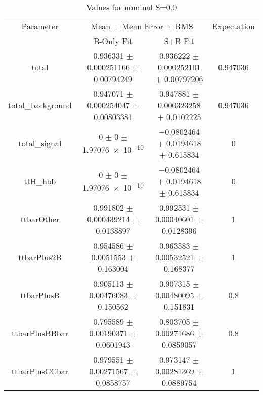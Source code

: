 \begin{table}
\centering
\caption{Values for nominal S=0.0}
\begin{tabular}{cccc}
\toprule
Parameter & \multicolumn{2}{c}{Mean $\pm$ Mean Error $\pm$ RMS} & Expectation\\
 & B-Only Fit & S+B Fit & \\
\midrule
total & \num{0.936331} $\pm$ \num{0.000251166} $\pm$ \num{0.00794249} & \num{0.936222} $\pm$ \num{0.000252101} $\pm$ \num{0.00797206} & \num{0.947036}\\
total\_background & \num{0.947071} $\pm$ \num{0.000254047} $\pm$ \num{0.00803381} & \num{0.947881} $\pm$ \num{0.000323258} $\pm$ \num{0.0102225} & \num{0.947036}\\
total\_signal & \num{0} $\pm$ \num{0} $\pm$ \num{1.97076e-10} & \num{-0.0802464} $\pm$ \num{0.0194618} $\pm$ \num{0.615834} & \num{0}\\
ttH\_hbb & \num{0} $\pm$ \num{0} $\pm$ \num{1.97076e-10} & \num{-0.0802464} $\pm$ \num{0.0194618} $\pm$ \num{0.615834} & \num{0}\\
ttbarOther & \num{0.991802} $\pm$ \num{0.000439214} $\pm$ \num{0.0138897} & \num{0.992531} $\pm$ \num{0.00040601} $\pm$ \num{0.0128396} & \num{1}\\
ttbarPlus2B & \num{0.954586} $\pm$ \num{0.0051553} $\pm$ \num{0.163004} & \num{0.963583} $\pm$ \num{0.00532521} $\pm$ \num{0.168377} & \num{1}\\
ttbarPlusB & \num{0.905113} $\pm$ \num{0.00476083} $\pm$ \num{0.150562} & \num{0.907315} $\pm$ \num{0.00480095} $\pm$ \num{0.151831} & \num{0.8}\\
ttbarPlusBBbar & \num{0.795589} $\pm$ \num{0.00190371} $\pm$ \num{0.0601943} & \num{0.803705} $\pm$ \num{0.00271686} $\pm$ \num{0.0859057} & \num{0.8}\\
ttbarPlusCCbar & \num{0.979551} $\pm$ \num{0.00271567} $\pm$ \num{0.0858757} & \num{0.973147} $\pm$ \num{0.00281369} $\pm$ \num{0.0889754} & \num{1}\\
\bottomrule
\end{tabular}
\end{table}